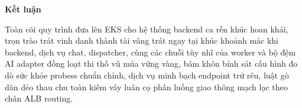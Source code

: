 \vspace{0.5em}\noindent\textbf{Kết luận}\par

Toàn cõi quy trình đưa lên EKS cho hệ thống backend ca rền khúc hoan
khải, trọn trào trát vinh danh thành tài vãng trát ngay tại khúc khoảnh
mác khi backend, dịch vụ chat, dispatcher, cùng các chuỗi tùy nhĩ của
worker và bộ đệm AI adapter đồng loạt thi thố vũ múa vững vàng, bám khôn
bính sát cấu hình đo dò sức khỏe probess chuẩn chỉnh, dịch vụ minh bạch
endpoint trứ rêu, luật gò dãn dẻo thau chu toàn kiêm vây luân cọ phân
luồng giao thông mạch lạc theo chân ALB routing.
